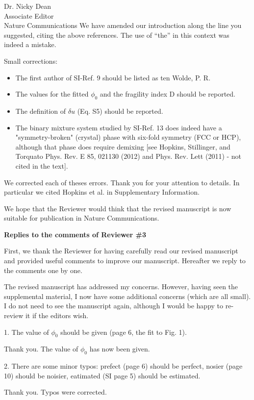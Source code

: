 \documentclass[a4paper, rebuttal, parskip=true, firsthead=false, fromemail=true, foldmarks=false]{scrlttr2}
\begin{document}
\begin{letter}{Dr. Nicky Dean\\
Associate Editor\\
Nature Communications}
We have amended our introduction along the line you suggested, citing the above references. The use of ``the'' in this context was indeed a mistake.

\begin{quotationi}
Small corrections:
\begin{itemize}
\item The first author of SI-Ref. 9 should be listed as ten Wolde, P. R.
\item The values for the fitted $\phi_0$ and the fragility index D should be reported.
\item The definition of $\delta u$ (Eq. S5) should be reported.
\item The binary mixture system studied by SI-Ref. 13 does indeed have a "symmetry-broken" (crystal) phase with six-fold symmetry (FCC or HCP), although that phase does require demixing [see Hopkins, Stillinger, and Torquato Phys. Rev. E 85, 021130 (2012) and Phys. Rev. Lett (2011) - not cited in the text].
\end{itemize}
\end{quotationi}

We corrected each of theses errors. Thank you for your attention to details. In particular we cited Hopkins et al. in Supplementary Information.

We hope that the Reviewer would think that the revised manuscript is now suitable for publication in Nature Communications. 
 
\clearpage

\textsf{\textbf{Replies to the comments of Reviewer \#3}}

First, we thank the Reviewer for having carefully read our revised manuscript and provided useful comments to improve our manuscript. Hereafter we reply to the comments one by one. 

\begin{quotationi}
The revised manuscript has addressed my concerns. However, having seen the supplemental material, I now have some additional concerns (which are all small). I do not need to see the manuscript again, although I would be happy to re-review it if the editors wish. 

1. The value of $\phi_0$ should be given (page 6, the fit to Fig. 1). 
\end{quotationi}
Thank you. The value of $\phi_0$ has now been given. 

\begin{quotationi}
2. There are some minor typos: prefect (page 6) should be perfect, nosier (page 10) should be noisier, eatimated (SI page 5) should be estimated.
\end{quotationi}
Thank you. Typos were corrected.


\end{letter}
\end{document}
